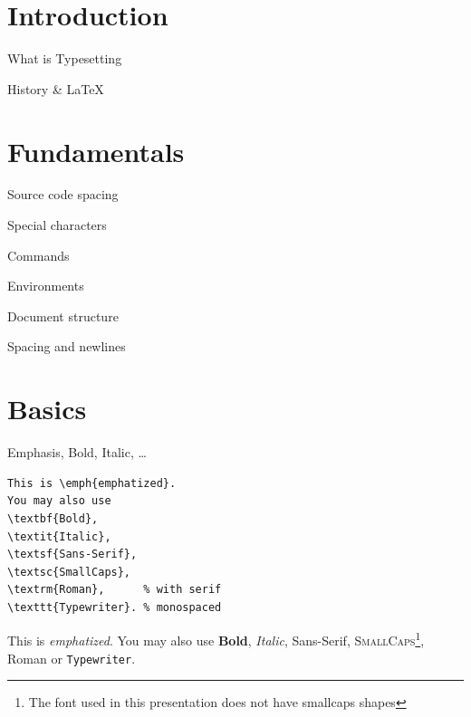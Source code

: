 \documentclass[xetex, onlymath]{beamer}
\begin{document}
\section{Introduction}

\begin{frame}{What is Typesetting}
\end{frame}

\begin{frame}{History \& \textrm{\LaTeX}}
\end{frame}

\section{Fundamentals}
\begin{frame}{Source code spacing}
\end{frame}

\begin{frame}{Special characters}
\end{frame}

\begin{frame}{Commands}
\end{frame}

\begin{frame}{Environments}
\end{frame}

\begin{frame}{Document structure}
\end{frame}

\begin{frame}{Spacing and newlines}
\end{frame}

\section{Basics}
\begin{frame}[fragile]{Emphasis, Bold, Italic, \ldots}
\begin{lstlisting}
This is \emph{emphatized}.
You may also use
\textbf{Bold},
\textit{Italic},
\textsf{Sans-Serif},
\textsc{SmallCaps},
\textrm{Roman},      % with serif
\texttt{Typewriter}. % monospaced
\end{lstlisting}

\begin{exampleblock}{}
This is \emph{emphatized}.
You may also use
\textbf{Bold},
\textit{Italic},
\textsf{Sans-Serif},
\textsc{SmallCaps}\footnote{The font used in this presentation does not have smallcaps shapes},
\textrm{Roman} or
\texttt{Typewriter}.
\end{exampleblock}
\end{frame}
\end{document}
